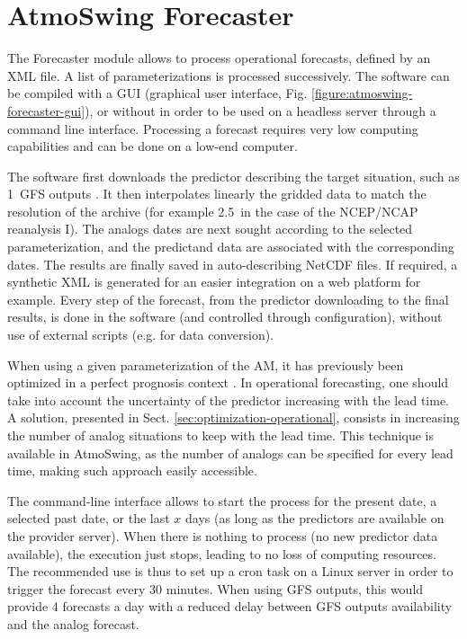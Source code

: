 \documentclass[review]{elsarticle}
\begin{document}
\section{AtmoSwing Forecaster}
\label{sec:forecaster}

The Forecaster module allows to process operational forecasts, defined by an XML file. A list of parameterizations is processed successively. The software can be compiled with a GUI (graphical user interface, Fig. \ref{figure:atmoswing-forecaster-gui}), or without in order to be used on a headless server through a command line interface. Processing a forecast requires very low computing capabilities and can be done on a low-end computer. 

The software first downloads the predictor describing the target situation, such as 1\degree\ GFS outputs \citep[Global Forecast System,][see Sect. \ref{sec:data}]{Kanamitsu1991,Kanamitsu1989}. It then interpolates linearly the gridded data to match the resolution of the archive (for example 2.5\degree\ in the case of the NCEP/NCAP reanalysis I). The analogs dates are next sought according to the selected parameterization, and the predictand data are associated with the corresponding dates. The results are finally saved in auto-describing NetCDF files. If required, a synthetic XML is generated for an easier integration on a web platform for example. Every step of the forecast, from the predictor downloading to the final results, is done in the software (and controlled through configuration), without use of external scripts (e.g. for data conversion).

When using a given parameterization of the AM, it has previously been optimized in a perfect prognosis context \citep[i.e. by optimizing on the reanalysis dataset; however, this does not take into account the uncertainty of the target situation when taken from operational forecasts of a Numerical Weather Prediction model,][]{Klein1963}. In operational forecasting, one should take into account the uncertainty of the predictor increasing with the lead time. A solution, presented in Sect. \ref{sec:optimization-operational}, consists in increasing the number of analog situations to keep with the lead time. This technique is available in AtmoSwing, as the number of analogs can be specified for every lead time, making such approach easily accessible.

The command-line interface allows to start the process for the present date, a selected past date, or the last $x$ days (as long as the predictors are available on the provider server). When there is nothing to process (no new predictor data available), the execution just stops, leading to no loss of computing resources. The recommended use is thus to set up a cron task on a Linux server in order to trigger the forecast every 30 minutes. When using GFS outputs, this would provide 4 forecasts a day with a reduced delay between GFS outputs availability and the analog forecast.
\end{document}
